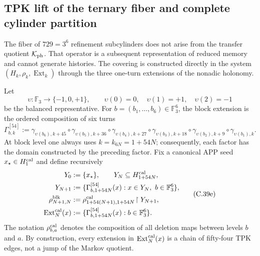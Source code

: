 \subsection{TPK lift of the ternary fiber and complete cylinder partition}
\label{subsec:elevacion-catalogal-ch}

The fiber of \(729=3^6\) refinement subcylinders does not arise from the transfer quotient
\(\mathcal K_{\rm ph}\). That operator is a subsequent representation of reduced
memory and cannot generate histories. The covering is constructed directly
in the system \((H_k,\rho_k,\operatorname{Ext}_k)\) through the three
one-turn extensions of the nonadic holonomy.





Let
\[
 \upsilon:\mathbb F_3\longrightarrow\{-1,0,+1\},\qquad
 \upsilon(0)=0,\quad\upsilon(1)=+1,\quad\upsilon(2)=-1
\]
be the balanced representative. For
\(b=(b_1,\ldots,b_6)\in\mathbb F_3^6\), the block extension is the
ordered composition of six turns
\[
 \Gamma_{b,k}^{[54]}:=
 \gamma_{\upsilon(b_6),k+45}\circ\gamma_{\upsilon(b_5),k+36}\circ
 \gamma_{\upsilon(b_4),k+27}\circ\gamma_{\upsilon(b_3),k+18}\circ
 \gamma_{\upsilon(b_2),k+9}\circ\gamma_{\upsilon(b_1),k}.
\tag{C.39d}
\label{eq:gamma-bloque-54-ch}
\]
At block level one always uses
\(k=k_{6N}=1+54N\); consequently, each factor has the domain constructed by
the preceding factor.
Fix a canonical APP seed \(x_\star\in H^{\rm cal}_1\) and define recursively
\[
 \begin{aligned}
  Y_0&:=\{x_\star\},\qquad Y_N\subseteq H_{1+54N}^{\rm cal},\\
  Y_{N+1}&:=\{\Gamma_{b,1+54N}^{[54]}(x):
                 x\in Y_N,\ b\in\mathbb F_3^6\},\\
  \rho^{\rm blk}_{N+1,N}
    &:=\rho^{\rm cal}_{1+54(N+1),1+54N}
       \!\upharpoonright Y_{N+1},\\
  \operatorname{Ext}^{\rm cal}_N(x)
    &:=\{\Gamma_{b,1+54N}^{[54]}(x):b\in\mathbb F_3^6\}.
 \end{aligned}
\tag{C.39e}
\label{eq:sincronizacion-54-ch}
\]
The notation \(\rho^{\rm cal}_{b,a}\) denotes the composition of all deletion maps
between levels \(b\) and \(a\). By construction, every extension in
\(\operatorname{Ext}^{\rm cal}_N(x)\) is a chain of fifty-four
TPK edges, not a jump of the Markov quotient.

